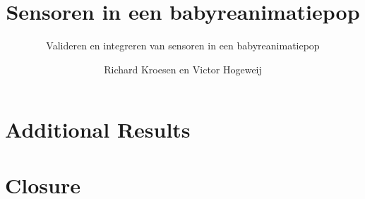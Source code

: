 \documentclass{layout/tudelft-report}
\begin{document}
    \frontmatter

    \title{Sensoren in een babyreanimatiepop}
    \subtitle{Valideren en integreren van sensoren in een babyreanimatiepop}
    \author{Richard Kroesen en Victor Hogeweij}
    \subject{Project Report}

    \makecover
    \afterpage{\blankpage}
    
    
    
    

    
    
    \tableofcontents    
    \printnomenclature
    \listoffigures
    \listoftables

    \mainmatter
    
    

    \epigraphhead[650]{}
    
    
    
    

    \epigraphhead[650]{}
    \part{Additional Results}
    \label{part:additional}
    
    
    

    \epigraphhead[650]{}
    \part{Closure}
    \label{part:closure}

    
    

    \printbibliography[title=References]
    
    \appendix
    
    
\end{document}
